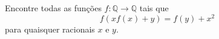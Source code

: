 Encontre todas as funções $f:\mathbb{Q}\to\mathbb{Q}$ tais que
\[f(xf(x)+y) = f(y) + x^2\] para quaisquer racionais $x$ e $y$.
